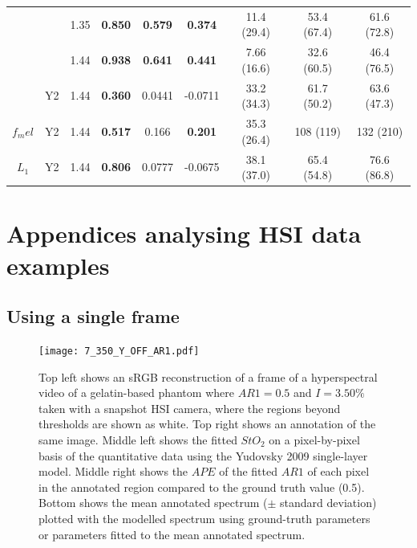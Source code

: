 \begin{subappendices}
\begin{table}[htb!]
\begin{tabular}{|ccc|ccc|ccc|}
        & & 1.35 & \textbf{0.850} & \textbf{0.579} & \textbf{0.374} & 11.4 (29.4) & 53.4 (67.4) & 61.6 (72.8) \\
        & & 1.44 & \textbf{0.938} & \textbf{0.641} & \textbf{0.441} & 7.66 (16.6) & 32.6 (60.5) & 46.4 (76.5) \\
        \cline{2-9}
        & Y2 & 1.44 & \textbf{0.360} & 0.0441 & -0.0711 & 33.2 (34.3) & 61.7 (50.2) & 63.6 (47.3) \\
        \hline
        $f_mel$ & Y2 & 1.44 & \textbf{0.517} & 0.166 & \textbf{0.201} & 35.3 (26.4) & 108 (119) & 132 (210) \\
        \hline
        $L_1$ & Y2 & 1.44 & \textbf{0.806} & 0.0777 & -0.0675 & 38.1 (37.0) & 65.4 (54.8) & 76.6 (86.8) \\
        \hline
    \end{tabular}    
    \label{ap:backwardsHSIMCr}
\end{table}
\FloatBarrier
\section{Appendices analysing HSI data examples}\label{ap:MoreHSIPhantomEgs}
\subsection{Using a single frame}
\begin{figure}[h!]
    \centering 
    \texttt{[image: 7\_350\_Y\_OFF\_AR1.pdf]}
    \caption{Top left shows an sRGB reconstruction of a frame of a hyperspectral video of a gelatin-based phantom where $AR1=0.5$ and $I=3.50\%$ taken with a snapshot HSI camera, where the regions beyond thresholds are shown as white. Top right shows an annotation of the same image. Middle left shows the fitted $StO_2$ on a pixel-by-pixel basis of the quantitative data using the Yudovsky 2009 single-layer model. Middle right shows the $APE$ of the fitted $AR1$ of each pixel in the annotated region compared to the ground truth value (0.5). Bottom shows the mean annotated spectrum ($\pm$ standard deviation) plotted with the modelled spectrum using ground-truth parameters or parameters fitted to the mean annotated spectrum.}
    \label{ap:gelatinpbpegQY}
\end{figure}


\end{subappendices}
